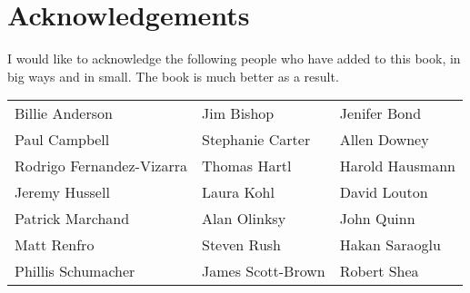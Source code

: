 
    \chapter*{Acknowledgements}
    \thispagestyle{empty}

    I would like to acknowledge the following people who have added to this book, in big ways and in small.  The book is much better as a result. 

    \vspace{.5in}

    \begin{doublespace}
    \begin{tabular}{p{2in}p{2in}p{2in}}
    Billie Anderson&Jim Bishop&Jenifer Bond\\
Paul Campbell&Stephanie Carter&Allen Downey\\
Rodrigo Fernandez-Vizarra&Thomas Hartl&Harold Hausmann\\
Jeremy Hussell&Laura Kohl&David Louton\\
Patrick Marchand&Alan Olinksy&John Quinn\\
Matt Renfro&Steven Rush&Hakan Saraoglu\\
Phillis Schumacher&James Scott-Brown&Robert Shea\\

     \end{tabular}
    \end{doublespace}
    